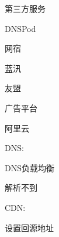 第三方服务
\begin{enumbox}
\item DNSPod
\item 网宿
\item 蓝汛
\item 友盟
\item 广告平台
\item 阿里云
\end{enumbox}

DNS:
\begin{enumbox}
\item DNS负载均衡
\item 解析不到
\end{enumbox}

CDN:
\begin{enumbox}
\item 设置回源地址
\end{enumbox}

